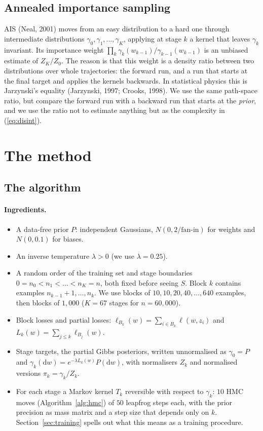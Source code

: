 \documentclass[11pt]{article}
\theoremstyle{definition}
\theoremstyle{remark}
\newcommand{\dd}{\mathrm{d}}
\begin{document}
\subsection{Annealed importance sampling}\label{sec:ais}
AIS (Neal, 2001) moves from an easy distribution to a hard one through intermediate distributions
$\gamma_0,\gamma_1,\dots,\gamma_K$, applying at stage $k$ a kernel that leaves $\gamma_k$ invariant. Its importance weight
$\prod_k\gamma_k(w_{k-1})/\gamma_{k-1}(w_{k-1})$ is an unbiased estimate of $Z_K/Z_0$. The reason is that this weight is a
density ratio between two distributions over whole trajectories: the forward run, and a run that starts at the final
target and applies the kernels backwards. In statistical physics this is Jarzynski's equality (Jarzynski, 1997; Crooks,
1998). We use the same path-space ratio, but compare the forward run with a backward run that starts at the
\emph{prior}, and we use the ratio not to estimate anything but as the complexity in (\ref{eq:disint}).

\section{The method}\label{sec:method}

\subsection{The algorithm}
\paragraph{Ingredients.}
\begin{itemize}[nosep]
\item A data-free prior $P$: independent Gaussians, $N(0,2/\text{fan-in})$ for weights and $N(0,0.1)$ for biases.
\item An inverse temperature $\lambda>0$ (we use $\lambda=0.25$).
\item A random order of the training set and stage boundaries $0=n_0<n_1<\dots<n_K=n$, both fixed before seeing $S$.
  Block $k$ contains examples $n_{k-1}+1,\dots,n_k$. We use blocks of $10,10,20,40,\dots,640$ examples, then blocks of
  $1{,}000$ ($K=67$ stages for $n=60{,}000$).
\item Block losses and partial losses: $\ell_{B_k}(w)=\sum_{i\in B_k}\ell(w,z_i)$ and $L_k(w)=\sum_{j\le k}\ell_{B_j}(w)$.
\item Stage targets, the partial Gibbs posteriors, written unnormalised as $\gamma_0=P$ and
  $\gamma_k(\dd w)=e^{-\lambda L_k(w)}P(\dd w)$, with normalisers $Z_k$ and normalised versions $\pi_k=\gamma_k/Z_k$.
\item For each stage a Markov kernel $T_k$ reversible with respect to $\gamma_k$: $10$ HMC moves
  (Algorithm~\ref{alg:hmc}) of $50$ leapfrog steps each, with the prior precision as mass matrix and a step size that
  depends only on $k$. Section~\ref{sec:training} spells out what this means as a training procedure.
\end{itemize}
\end{document}

